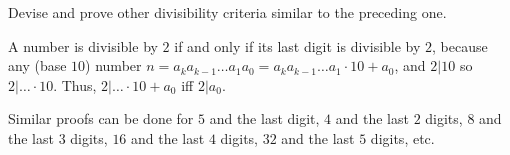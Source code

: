 \documentclass[../main.tex]{subfiles}
\begin{document}
\begin{ex} \label{1.24}
Devise and prove other divisibility criteria similar to the preceding one.
\end{ex}

A number is divisible by $2$ if and only if its last digit is divisible by $2$, because any (base $10$) number $n=a_{k}a_{k-1}\ldots a_1 a_0 = a_{k}a_{k-1}\ldots a_1 \cdot 10 + a_0$, and $2 | 10$ so $2 | \ldots \cdot 10$. Thus, $2 | \ldots \cdot 10 + a_0$ iff $2 | a_0$.

Similar proofs can be done for $5$ and the last digit, $4$ and the last $2$ digits, $8$ and the last $3$ digits, $16$ and the last $4$ digits, $32$ and the last $5$ digits, etc.
\end{document}
